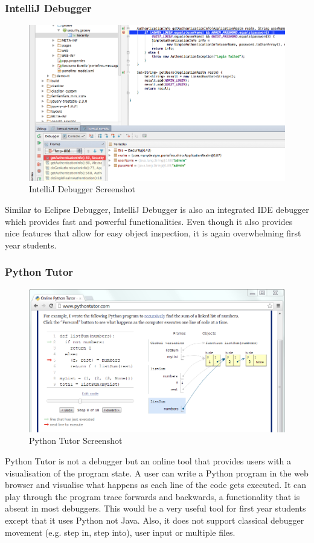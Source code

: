\documentclass[11pt, a4paper]{article}
\begin{document}
\subsubsection{IntelliJ Debugger}
\begin{figure}[h!]
\centering
\includegraphics[width=125mm]{intellij.png}
\caption{IntelliJ Debugger Screenshot}
\end{figure}

Similar to Eclipse Debugger, IntelliJ Debugger is also an integrated IDE debugger which provides fast and powerful functionalities.
Even though it also provides nice features that allow for easy object inspection, it is again overwhelming first year students.
\subsubsection{Python Tutor}
\begin{figure}[h!]
\centering
\includegraphics[width=125mm]{pythontutor.png}
\caption{Python Tutor Screenshot}
\end{figure}

Python Tutor is not a debugger but an online tool that provides users with a visualisation of the program state.
A user can write a Python program in the web browser and visualise what happens as each line of the code gets executed.
It can play through the program trace forwards and backwards, a functionality that is absent in most debuggers.
This would be a very useful tool for first year students except that it uses Python not Java. Also, it does not support classical debugger movement (e.g. step in, step into), user input or multiple files.
\end{document}
